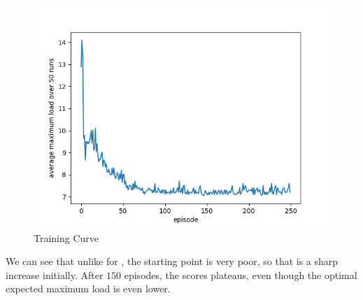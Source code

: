 \begin{figure}[hbt!] \label{graphical-two-choice-hyperparameter-importance}
    \centering
    \includegraphics[scale=1.0]{Chapter4/Figs/training_progression_hypercube_4_25.png}
    \caption{\GraphicalTwoChoice Training Curve}
\end{figure}

We can see that unlike for \TwoThinning, the starting point is very poor, so that is a sharp increase initially. After $150$ episodes, the scores plateaus, even though the optimal expected maximum load is even lower.
